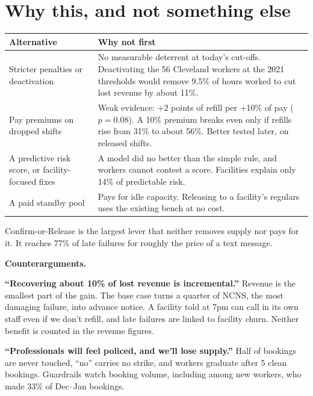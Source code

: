 \section{Why this, and not something else}

\begin{center}\small
{}
\begin{tabularx}{\textwidth}{@{}P{0.24\textwidth}L@{}}
\toprule
Alternative & Why not first \\
\midrule
Stricter penalties or deactivation & No measurable deterrent at today's cut-offs. Deactivating the 56 Cleveland workers
at the 2021 thresholds would remove 9.5\% of hours worked to cut lost revenue by about 11\%. \\
Pay premiums on dropped shifts & Weak evidence: +2 points of refill per +10\% of pay ($p=0.08$). A 10\% premium breaks
even only if refills rise from 31\% to about 56\%. Better tested later, on released shifts. \\
A predictive risk score, or facility-focused fixes & A model did no better than the simple rule, and workers cannot
contest a score. Facilities explain only 14\% of predictable risk. \\
A paid standby pool & Pays for idle capacity. Releasing to a facility's regulars uses the existing bench at no cost. \\
\bottomrule
\end{tabularx}
\end{center}

Confirm-or-Release is the largest lever that neither removes supply nor pays for it. It reaches 77\% of late failures for
roughly the price of a text message.

\textbf{Counterarguments.}

\textbf{``Recovering about 10\% of lost revenue is incremental.''} Revenue is the smallest part of the gain. The base
case turns a quarter of NCNS, the most damaging failure, into advance notice. A facility told at 7pm can call in its own
staff even if we don't refill, and late failures are linked to facility churn. Neither benefit is counted in the revenue
figures.

\textbf{``Professionals will feel policed, and we'll lose supply.''} Half of bookings are never touched, ``no'' carries
no strike, and workers graduate after 5 clean bookings. Guardrails watch booking volume, including among new workers, who
made 33\% of Dec--Jan bookings.

